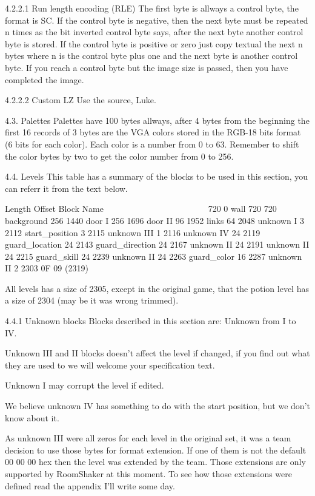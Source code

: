 4.2.2.1 Run length encoding (RLE)
 The first byte is allways a control byte, the format is SC. If the control
 byte is negative, then the next byte must be repeated n times as the bit
 inverted control byte says, after the next byte another control byte is
 stored.
 If the control byte is positive or zero just copy textual the next n bytes
 where n is the control byte plus one and the next byte is another control
 byte.
 If you reach a control byte but the image size is passed, then you have
 completed the image.

4.2.2.2 Custom LZ
 Use the source, Luke.
 
4.3. Palettes
 Palettes have 100 bytes allways, after 4 bytes from the beginning the
 first 16 records of 3 bytes are the VGA colors stored in the RGB-18 bits
 format (6 bits for each color). Each color is a number from 0 to 63.
 Remember to shift the color bytes by two to get the color number from 0
 to 256.
 
4.4. Levels
 This table has a summary of the blocks to be used in this section,
 you can referr it from the text below.

 Length Offset  Block Name
 ~~~~~~ ~~~~~~  ~~~~~~~~~~
 720    0       wall
 720    720     background
 256    1440    door I
 256    1696    door II
 96     1952    links
 64     2048    unknown I
 3      2112    start_position
 3      2115    unknown III
 1      2116    unknown IV
 24     2119    guard_location
 24     2143    guard_direction
 24     2167    unknown II
 24     2191    unknown II
 24     2215    guard_skill
 24     2239    unknown II
 24     2263    guard_color
 16     2287    unknown II
 2      2303    0F 09 (2319)

 All levels has a size of 2305, except in the original game, that the
 potion level has a size of 2304 (may be it was wrong trimmed).

4.4.1 Unknown blocks
 Blocks described in this section are: Unknown from I to IV.

 Unknown III and II blocks doesn't affect the level if changed, if you find
 out what they are used to we will welcome your specification text.

 Unknown I may corrupt the level if edited.

 We believe unknown IV has something to do with the start position, but we
 don't know about it.

 As unknown III were all zeros for each level in the original set, it was a
 team decision to use those bytes for format extension. If one of them is
 not the default 00 00 00 hex then the level was extended by the team.
 Those extensions are only supported by RoomShaker at this  moment. To see
 how those extensions were defined read the appendix I'll write some day.
 

